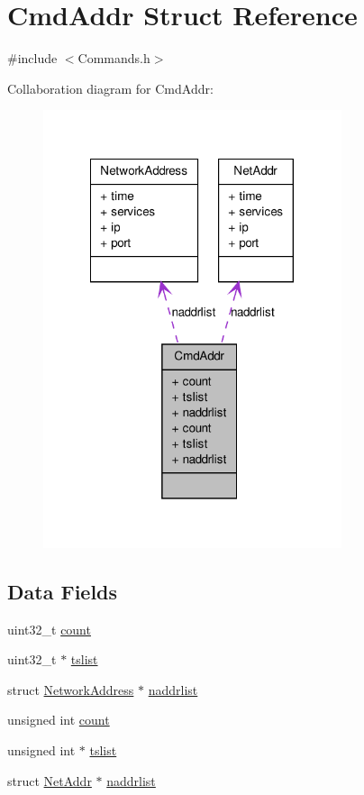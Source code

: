 \hypertarget{struct_cmd_addr}{
\section{CmdAddr Struct Reference}
\label{struct_cmd_addr}
}


{\ttfamily \#include $<$Commands.h$>$}



Collaboration diagram for CmdAddr:\nopagebreak
\begin{figure}[H]
\begin{center}
\leavevmode
\includegraphics[width=248pt]{struct_cmd_addr__coll__graph}
\end{center}
\end{figure}
\subsection*{Data Fields}
\begin{DoxyCompactItemize}
\item 
uint32\_\-t \hyperlink{struct_cmd_addr_a86988a65e0d3ece7990c032c159786d6}{count}
\item 
uint32\_\-t $\ast$ \hyperlink{struct_cmd_addr_a690496cb0763044d995a40b46e8f7d32}{tslist}
\item 
struct \hyperlink{struct_network_address}{NetworkAddress} $\ast$ \hyperlink{struct_cmd_addr_a39e0b80e0408806939286dfb40cfd081}{naddrlist}
\item 
unsigned int \hyperlink{struct_cmd_addr_a16ff2d8e15ade4948398b0aeb80124a8}{count}
\item 
unsigned int $\ast$ \hyperlink{struct_cmd_addr_af8bd06c27cd9c81c75e60853080e7e7e}{tslist}
\item 
struct \hyperlink{struct_net_addr}{NetAddr} $\ast$ \hyperlink{struct_cmd_addr_a65d94e910a546e06b09f1daa9978e52c}{naddrlist}
\end{DoxyCompactItemize}


